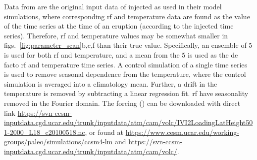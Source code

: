 \documentclass{ametsocV6.1}
\newcommand{\iso}[1][i]{{#1}njected \ce{SO2}}
\begin{document}
\appendix


Data from \citet{ottobliesner2016} are the original input data of \iso{} as used in
their model simulations, where corresponding \gls{rf} and temperature data are found as
the value of the time series at the time of an eruption (according to the \iso{} time
series). Therefore, \gls{rf} and temperature values may be somewhat smaller in
figs.~\ref{fig:parameter_scan}b,c,f than their true value. Specifically, an ensemble of
5 is used for both \gls{rf} and temperature, and a mean from the 5 is used as the de
facto \gls{rf} and temperature time series. A control simulation of a single time series
is used to remove seasonal dependence from the temperature, where the control simulation
is averaged into a climatology mean. Further, a drift in the temperature is removed by
subtracting a linear regression fit. \gls{rf} have seasonality removed in the Fourier
domain. The forcing () can be downloaded with direct link
\url{https://svn-ccsm-inputdata.cgd.ucar.edu/trunk/inputdata/atm/cam/volc/IVI2LoadingLatHeight501-2000_L18_c20100518.nc},
or found at \url{https://www.cesm.ucar.edu/working-groups/paleo/simulations/ccsm4-lm}
and \url{https://svn-ccsm-inputdata.cgd.ucar.edu/trunk/inputdata/atm/cam/volc/}.

% 
% 

  \clearpage
\printglossary[type=\acronymtype,title=List of Acronyms]
\end{document}
